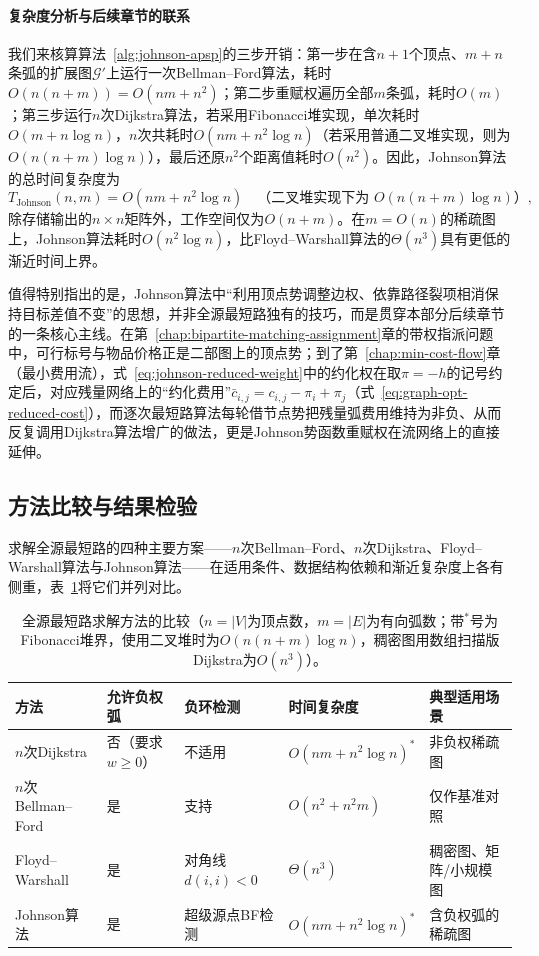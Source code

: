\paragraph{复杂度分析与后续章节的联系}
我们来核算算法~\ref{alg:johnson-apsp}的三步开销：第一步在含$n+1$个顶点、$m+n$条弧的扩展图$\mathcal G'$上运行一次Bellman--Ford算法，耗时$O(n(n+m))=O(nm+n^2)$；第二步重赋权遍历全部$m$条弧，耗时$O(m)$；第三步运行$n$次Dijkstra算法，若采用Fibonacci堆实现，单次耗时$O(m+n\log n)$，$n$次共耗时$O(nm+n^2\log n)$（若采用普通二叉堆实现，则为$O(n(n+m)\log n)$），最后还原$n^2$个距离值耗时$O(n^2)$。因此，Johnson算法的总时间复杂度为
\begin{equation}
  T_{\mathrm{Johnson}}(n,m) = O(nm + n^2\log n)\quad\text{（二叉堆实现下为 }O(n(n+m)\log n)\text{）},
  \label{eq:johnson-complexity}
\end{equation}
除存储输出的$n\times n$矩阵外，工作空间仅为$O(n+m)$。在$m=O(n)$的稀疏图上，Johnson算法耗时$O(n^2\log n)$，比Floyd--Warshall算法的$\Theta(n^3)$具有更低的渐近时间上界。

值得特别指出的是，Johnson算法中“利用顶点势调整边权、依靠路径裂项相消保持目标差值不变”的思想，并非全源最短路独有的技巧，而是贯穿本部分后续章节的一条核心主线。在第~\ref{chap:bipartite-matching-assignment}章的带权指派问题中，可行标号与物品价格正是二部图上的顶点势；到了第~\ref{chap:min-cost-flow}章（最小费用流），式~\eqref{eq:johnson-reduced-weight}中的约化权在取$\pi=-h$的记号约定后，对应残量网络上的“约化费用”$\bar c_{i,j}=c_{i,j}-\pi_i+\pi_j$（式~\eqref{eq:graph-opt-reduced-cost}），而逐次最短路算法每轮借节点势把残量弧费用维持为非负、从而反复调用Dijkstra算法增广的做法，更是Johnson势函数重赋权在流网络上的直接延伸。

\subsection{方法比较与结果检验}
\label{sec:apsp-comparison}

求解全源最短路的四种主要方案——$n$次Bellman--Ford、$n$次Dijkstra、Floyd--Warshall算法与Johnson算法——在适用条件、数据结构依赖和渐近复杂度上各有侧重，表~\ref{tab:apsp-methods-comparison}将它们并列对比。

\begin{table}[!htb]
  \centering
  \begin{tabular}{@{}lllll@{}}
    \toprule
    方法 & 允许负权弧 & 负环检测 & 时间复杂度 & 典型适用场景 \\
    \midrule
    $n$次Dijkstra & 否（要求$w\geq0$） & 不适用 & $O(nm+n^2\log n)^*$ & 非负权稀疏图 \\
    $n$次Bellman--Ford & 是 & 支持 & $O(n^2+n^2m)$ & 仅作基准对照 \\
    Floyd--Warshall & 是 & 对角线$d(i,i)<0$ & $\Theta(n^3)$ & 稠密图、矩阵/小规模图 \\
    Johnson算法 & 是 & 超级源点BF检测 & $O(nm+n^2\log n)^*$ & 含负权弧的稀疏图 \\
    \bottomrule
  \end{tabular}
  \caption{全源最短路求解方法的比较（$n=|V|$为顶点数，$m=|E|$为有向弧数；带$^*$号为Fibonacci堆界，使用二叉堆时为$O(n(n+m)\log n)$，稠密图用数组扫描版Dijkstra为$O(n^3)$）。}
  \label{tab:apsp-methods-comparison}
\end{table}

